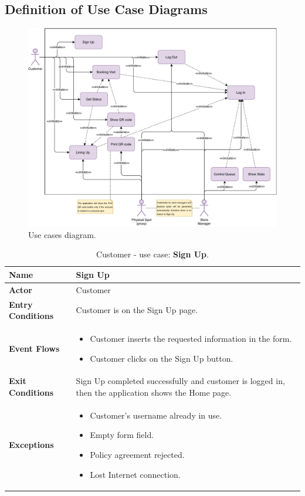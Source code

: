 \subsection{Definition of Use Case Diagrams}


\begin{figure}[H]
	\centering
	\includegraphics[width=1.0\textwidth]{images/use_cases_diagram.pdf}
	\caption{Use cases diagram.}
\end{figure}

\begin{table}[H]
\centering
\begin{tabular}{| m{} | m{} |} 
	\hline
	\textbf{Name} & Sign Up \\ 
	\hline
	\textbf{Actor} & Customer \\ 
	\hline
	\textbf{Entry Conditions} & Customer is on the Sign Up page. \\ 
	\hline
	\textbf{Event Flows} &
	\begin{itemize}
		\item Customer inserts the requested information in the form.
		\item Customer clicks on the Sign Up button.
	\end{itemize} \\ 
	\hline
	\textbf{Exit Conditions} & Sign Up completed successfully and customer is logged in, then the application shows the Home page. \\ 
	\hline
	\textbf{Exceptions} &
	\begin{itemize}
		\item Customer's username already in use.
		\item Empty form field.
		\item Policy agreement rejected.
		\item Lost Internet connection.
	\end{itemize} \\ 
	\hline
\end{tabular}
\caption{Customer - use case: \textbf{Sign Up}.}
\label{tableSignUp}
\end{table}

